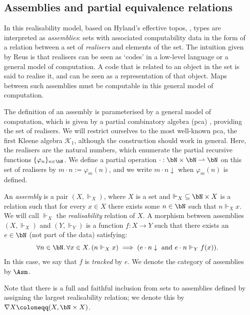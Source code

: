 
\subsection{Assemblies and partial equivalence relations}


In this realisability model, based on Hyland's effective topos, \cite{hyland_effective_1982}, types are interpreted as \emph{assemblies}: sets with associated computability data in the form of a relation between a set of \emph{realisers} and elements of the set.
The intuition given by Reus \cite{REUS1999128} is that realisers can be seen as `codes' in a low-level language or a general model of computation. A code that is related to an object in the set is said to realise it, and can be seen as a representation of that object. Maps between such assemblies must be computable in this general model of computation. 

The definition of an assembly is parameterised by a general model of computation, which is given by a partial combinatory algebra (pca) \cite{feferman}, providing the set of realisers. We will restrict ourselves to the most well-known pca, the first Kleene algebra \( \mathcal{K}_1 \), although the construction should work in general.
Here, the realisers are the natural numbers, which enumerate the partial recursive functions \(\{\varphi_n\}_{n \in \bN} \).  We define a partial operation \( \cdot : \bN \times \bN \rightharpoonup \bN \) on this set of realisers by \( m \cdot n := \varphi_m(n) \), and we write \( {m \cdot n \downarrow} \) when \( \varphi_m(n) \) is defined. 
\begin{definition}
    An \emph{assembly} is a pair $(X, \Vdash_X)$, where $X$ is a set and ${\Vdash_X} \subseteq \bN \times X$ is a relation such that for every \( x \in X \) there exists some \( n \in \bN \) such that \( n \Vdash_X x \). We will call \( \Vdash_X \) the \emph{realisability} relation of \( X \). A morphism between assemblies \((X, \Vdash_X)\) and \( (Y, \Vdash_Y) \) is a function \( f : X \to  Y \) such that there exists an \( e \in \bN \) (not part of the data) satisfying:
\[
    \forall n \in \bN.\,\forall x \in X.\,(n \Vdash_X x) \implies (e \cdot n \downarrow \mbox{ and } e \cdot n \Vdash_Y f(x)).
\] 
In this case, we say that \(f\) is \emph{tracked} by \(e\). We denote the category of assemblies by \( \Asm \).
\end{definition}
Note that there is a full and faithful inclusion from sets to assemblies defined by assigning the largest realisability relation; we denote this by \( \nabla X \coloneqq (X, \bN \times X) \). 


